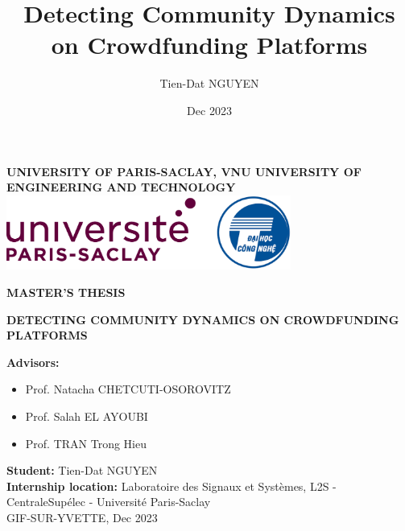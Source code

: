 \title{Detecting Community Dynamics on Crowdfunding Platforms}
\author{Tien-Dat NGUYEN}
\date{Dec 2023}
\begin{titlepage}
	\centering
	\vspace*{1cm}

	{\Large \textbf{UNIVERSITY OF PARIS-SACLAY, VNU UNIVERSITY OF ENGINEERING AND TECHNOLOGY}}\\[1cm]

	\includegraphics[width=0.7\textwidth]{images/logo_combine.png}
	\vspace*{4cm}


	{\Large \textbf{MASTER'S THESIS}}\\[0.5cm]

	{\Huge \textbf{DETECTING COMMUNITY DYNAMICS ON CROWDFUNDING PLATFORMS} \par}
	\vspace*{2cm}
	{\large \textbf{Advisors:}}
	\begin{large}
		\begin{itemize}
			\item Prof. Natacha CHETCUTI-OSOROVITZ
			\item Prof. Salah EL AYOUBI
			\item Prof. TRAN Trong Hieu
		\end{itemize}
	\end{large}
	\vspace*{1cm}
	{\large \textbf{Student:} Tien-Dat NGUYEN}\\[0.5cm]

	{\large \textbf{Internship location:} Laboratoire des Signaux et Systèmes, L2S - CentraleSupélec - Université Paris-Saclay}\\[0.25cm]

	{\large GIF-SUR-YVETTE, Dec 2023 }\\[0.25cm]


	\vfill
\end{titlepage}
